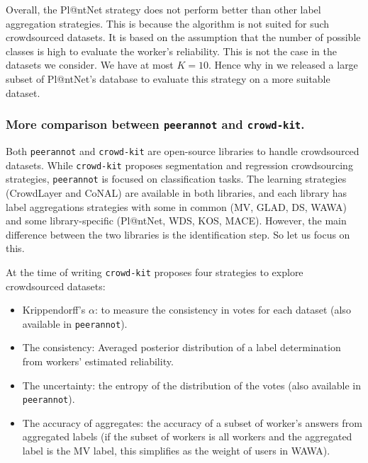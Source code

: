 Overall, the Pl@ntNet strategy does not perform better than other label aggregation strategies. This is because the algorithm is not suited for such crowdsourced datasets. It is based on the assumption that the number of possible classes is high to evaluate the worker's reliability. This is not the case in the datasets we consider. We have at most $K=10$. Hence why in  we released a large subset of Pl@ntNet's database to evaluate this strategy on a more suitable dataset.

\subsubsection{More comparison between \texttt{peerannot} and \texttt{crowd-kit}.}

Both \texttt{peerannot} and \texttt{crowd-kit} are open-source libraries to handle crowdsourced datasets.
While \texttt{crowd-kit} proposes segmentation and regression crowdsourcing strategies, \texttt{peerannot} is focused on classification tasks.
The learning strategies (CrowdLayer and CoNAL) are available in both libraries, and each library has label aggregations strategies with some in common (MV, GLAD, DS, WAWA) and some library-specific (Pl@ntNet, WDS, KOS, MACE).
However, the main difference between the two libraries is the identification step. So let us focus on this.

At the time of writing \texttt{crowd-kit} proposes four strategies to explore crowdsourced datasets:
\begin{itemize}
    \item Krippendorff's $\alpha$: to measure the consistency in votes for each dataset (also available in \texttt{peerannot}).
    \item The consistency: Averaged posterior distribution of a label determination from workers' estimated reliability.
    \item The uncertainty: the entropy of the distribution of the votes (also available in \texttt{peerannot}).
    \item The accuracy of aggregates: the accuracy of a subset of worker's answers from aggregated labels (if the subset of workers is all workers and the aggregated label is the MV label, this simplifies as the weight of users in WAWA).
\end{itemize}

